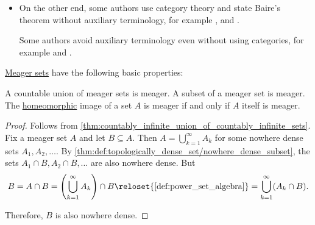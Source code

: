 \begin{remark}
\begin{itemize}
    \Textcite[201]{Kelley1975GeneralTopology} does not discuss category theory, but prefers the term \enquote{meager}.

    \item On the other end, some authors use category theory and state Baire's theorem without auxiliary terminology, for example
    \cite[78]{КолмогоровФомин2009ФункциональныйАнализ},
    \cite[30]{ФедорчукФилиппов2006ОбщаяТопология} and
    \cite[162]{Хелемский2014ФункциональныйАнализ}.

    Some authors avoid auxiliary terminology even without using categories, for example
    \cite[thm. 3.9.3]{Engelking1989GeneralTopology} and
    \cite[50]{Deimling1985NonlinearFA}.
  \end{itemize}
\end{remark}

\begin{proposition}\label{thm:def:meager_set}
  \hyperref[def:meager_set]{Meager sets} have the following basic properties:
  \begin{thmenum}
     A countable union of meager sets is meager.
     A subset of a meager set is meager.
     The \hyperref[def:homeomorphism]{homeomorphic} image of a set \( A \) is meager if and only if \( A \) itself is meager.
  \end{thmenum}
\end{proposition}
\begin{proof}
   Follows from \cref{thm:countably_infinite_union_of_countably_infinite_sets}.
   Fix a meager set \( A \) and let \( B \subseteq A \). Then \( A = \bigcup_{k=1}^\infty A_k \) for some nowhere dense sets \( A_1, A_2, \ldots \). By \cref{thm:def:topologically_dense_set/nowhere_dense_subset}, the sets \( A_1 \cap B, A_2 \cap B, \ldots \) are also nowhere dense. But
  \begin{equation*}
    B
    =
    A \cap B
    =
    \left(\bigcup_{k=1}^\infty A_k \right) \cap B
    \reloset {\ref{def:power_set_algebra}} =
    \bigcup_{k=1}^\infty (A_k \cap B).
  \end{equation*}

  Therefore, \( B \) is also nowhere dense.

\end{proof}

